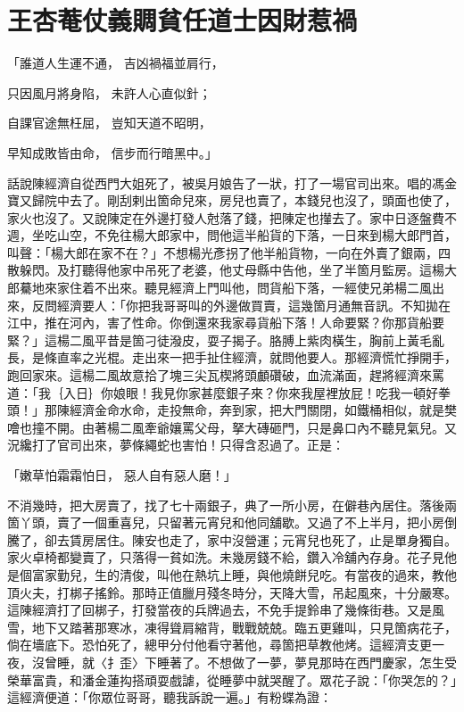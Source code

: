 %

\chapter{王杏菴仗義賙貧\KG 任道士因財惹禍}


\begin{showcontents}{}




「誰道人生運不通，  吉凶禍福並肩行，

只因風月將身陷，  未許人心直似針；

自課官途無枉屈，  豈知天道不昭明，

早知成敗皆由命，  信步而行暗黑中。」

話說陳經濟自從西門大姐死了，被吳月娘告了一狀，打了一場官司出來。唱的馮金寶又歸院中去了。剛刮剌出箇命兒來，房兒也賣了，本錢兒也沒了，頭面也使了，家火也沒了。又說陳定在外邊打發人尅落了錢，把陳定也攆去了。家中日逐盤費不週，坐吃山空，不免往楊大郎家中，問他這半船貨的下落，一日來到楊大郎門首，叫聲：「楊大郎在家不在？」不想楊光彥拐了他半船貨物，一向在外賣了銀兩，四散躲閃。及打聽得他家中吊死了老婆，他丈母縣中告他，坐了半箇月監房。這楊大郎驀地來家住着不出來。聽見經濟上門叫他，問貨船下落，一經使兄弟楊二風出來，反問經濟要人：「你把我哥哥叫的外邊做買賣，這幾箇月通無音訊。不知拋在江中，推在河內，害了性命。你倒還來我家尋貨船下落！人命要緊？你那貨船要緊？」這楊二風平昔是箇刁徒潑皮，耍子揭子。胳膊上紫肉橫生，胸前上黃毛亂長，是條直率之光棍。走出來一把手扯住經濟，就問他要人。那經濟慌忙掙開手，跑回家來。這楊二風故意拾了塊三尖瓦楔將頭顱礸破，血流滿面，趕將經濟來罵道：「我｛入日｝你娘眼！我見你家甚麼銀子來？你來我屋裡放屁！吃我一頓好拳頭！」那陳經濟金命水命，走投無命，奔到家，把大門關閉，如鐵桶相似，就是樊噲也撞不開。由著楊二風牽爺孃罵父母，拏大磚砸門，只是鼻口內不聽見氣兒。又況纔打了官司出來，夢條繩蛇也害怕！只得含忍過了。正是：

「嫩草怕霜霜怕日，  惡人自有惡人磨！」

不消幾時，把大房賣了，找了七十兩銀子，典了一所小房，在僻巷內居住。落後兩箇丫頭，賣了一個重喜兒，只留著元宵兒和他同舖歇。又過了不上半月，把小房倒騰了，卻去賃房居住。陳安也走了，家中沒營運；元宵兒也死了，止是單身獨自。家火卓椅都變賣了，只落得一貧如洗。未幾房錢不給，鑽入冷舖內存身。花子見他是個富家勤兒，生的清俊，叫他在熱坑上睡，與他燒餅兒吃。有當夜的過來，教他頂火夫，打梆子搖鈴。那時正值臘月殘冬時分，天降大雪，吊起風來，十分嚴寒。這陳經濟打了回梆子，打發當夜的兵牌過去，不免手提鈴串了幾條街巷。又是風雪，地下又踏著那寒冰，凍得聳肩縮背，戰戰兢兢。臨五更雞叫，只見箇病花子，倘在墻底下。恐怕死了，總甲分付他看守著他，尋箇把草教他烤。這經濟支更一夜，沒曾睡，就〈扌歪〉下睡著了。不想做了一夢，夢見那時在西門慶家，怎生受榮華富貴，和潘金蓮抅搭頑耍戲謔，從睡夢中就哭醒了。眾花子說：「你哭怎的？」這經濟便道：「你眾位哥哥，聽我訴說一遍。」有粉蝶為證：


\end{showcontents}
